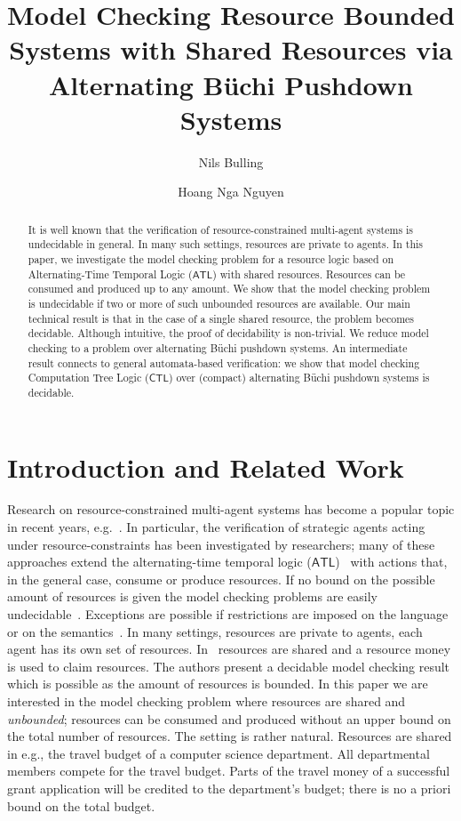 \documentclass{llncs}
\title{Model Checking Resource Bounded Systems with Shared Resources via Alternating B\"uchi Pushdown Systems}
\author{Nils Bulling\inst{1}  \and Hoang Nga Nguyen\inst{2} }
\institute{
Delft University of Technology, The Netherlands \and
School of Computer Science, University of Nottingham, UK\\
}
\renewcommand{\CTL}{\ensuremath{\mathsf{CTL}}\xspace}
\renewcommand{\ATL}{\ensuremath{\mathsf{ATL}}\xspace}
\begin{document}
\maketitle


\begin{abstract}
It is well known that the verification of resource-constrained multi-agent systems is undecidable in general. In many such settings, resources are private to agents. In this paper, we investigate the model checking problem for a resource logic based on Alternating-Time Temporal Logic (\ATL) with shared resources. Resources can be consumed and produced up to any amount. We show that the model checking problem is undecidable if two or more of such unbounded resources are available. Our main technical result is that in the case of a single shared resource, the problem becomes decidable. Although intuitive, the proof of decidability is non-trivial. We  reduce model checking to a problem over alternating B\"uchi pushdown systems. An  intermediate result connects to general automata-based  verification: we show that model checking Computation Tree Logic (\CTL) over (compact) alternating B\"uchi pushdown systems is decidable.
\end{abstract}

\section{Introduction and Related Work}
Research on resource-constrained multi-agent systems has become a popular topic in recent years, e.g.~\cite{BullingFarwer09rtl-clima-post,Bulling/Farwer:10a,Alechina//:10a,DellaMonica//:13a,Alechina//:14c,Bulling15ral-IJCAI}. In particular, the verification of strategic agents acting under resource-constraints has been investigated by  researchers; many of these approaches extend the alternating-time temporal logic (\ATL)~\cite{Alur//:02a} with actions that, in the general case, consume or produce resources. If no bound on the possible amount of resources is given the model checking problems are easily undecidable~\cite{Bulling/Farwer:10a}. Exceptions are possible if restrictions are imposed on the language~\cite{Bulling15ral-IJCAI} or on the semantics~\cite{Alechina//:14c,DellaMonica//:13a}. In many settings,  resources are private to agents, each agent has its own set of resources. In~\cite{DellaMonica//:13a}  resources are shared and a resource money is used to claim resources. The authors present a decidable model checking result which is possible as the amount of resources is bounded. In this paper we are interested in the model checking problem where resources are shared and \emph{unbounded}; resources can be consumed and produced without an upper bound on the total number of resources. The setting is rather natural. Resources are shared in e.g.,  the travel budget of a computer science department. All departmental members compete for the travel budget. Parts of the travel money of a successful grant application will be credited to the department's budget; there is no a priori bound on the total budget.
\end{document}
